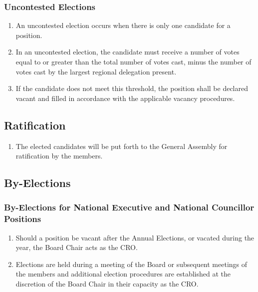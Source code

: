 \subsubsection{Uncontested Elections}
\label{uncontested-elections}

\begin{enumerate}
 \item
  An uncontested election occurs when there is only one candidate for a position.
 \item
  In an uncontested election, the candidate must receive a number of votes equal to or greater than the total number of votes cast, minus the number of votes cast by the largest regional delegation present.
 \item
  If the candidate does not meet this threshold, the position shall be declared vacant and filled in accordance with the applicable vacancy procedures.
\end{enumerate}

\subsection{Ratification}
\label{ratification}

\begin{enumerate}
 \item
  The elected candidates will be put forth to the General Assembly for ratification by the members.
\end{enumerate}

\subsection{By-Elections}
\label{by-elections}

\subsubsection{By-Elections for National Executive and National Councillor Positions}
\label{by-elections-for-national-executive-and-national-councillor-positions}

\begin{enumerate}
 \item
  Should a position be vacant after the Annual Elections, or vacated during the year, the Board Chair acts as the CRO.
 \item
  Elections are held during a meeting of the Board or subsequent meetings of the members and additional election procedures are established at the discretion of the Board Chair in their capacity as the CRO.
\end{enumerate}

